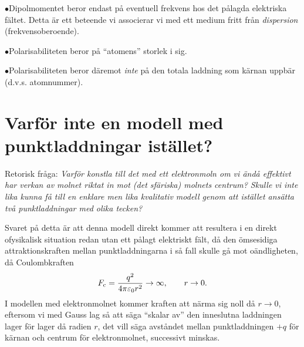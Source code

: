\item{$\bullet$}{Dipolmomentet beror endast p{\aa} eventuell frekvens hos
                 det p{\aa}lagda elektriska f{\"a}ltet. Detta {\"a}r ett
                 beteende vi associerar vi med ett medium fritt fr{\aa}n
                 {\it dispersion} (frekvensoberoende).}
\item{$\bullet$}{Polarisabiliteten beror p{\aa} ``atomens''
                 storlek i sig.}
\item{$\bullet$}{Polarisabiliteten beror d{\"a}remot {\it inte} p{\aa} den
                 totala laddning som k{\"a}rnan uppb{\"a}r (d.v.s. atomnummer).}
\medskip
\section{Varf{\"o}r inte en modell med punktladdningar ist{\"a}llet?}
Retorisk fr{\aa}ga: {\it Varf{\"o}r konstla till det med ett elektronmoln om vi
{\"a}nd{\aa} effektivt har verkan av molnet riktat in mot (det sf{\"a}riska)
molnets centrum? Skulle vi inte lika kunna f{\aa} till en enklare men lika
kvalitativ modell genom att ist{\"a}llet ans{\"a}tta tv{\aa} punktladdningar
med olika tecken?}

Svaret p{\aa} detta {\"a}r att denna modell direkt kommer att resultera i en
direkt ofysikalisk situa\-tion redan utan ett p{\aa}lagt elektriskt f{\"a}lt,
d{\aa} den {\"o}msesidiga attraktionskraften mellan punktladdningarna i s{\aa}
fall skulle g{\aa} mot o{\"a}ndligheten, d{\aa} Coulombkraften
$$
F_{\rm c}={{q^2}\over{4\pi\varepsilon_0 r^2}}\to\infty,\qquad r\to 0.
$$
I modellen med elektronmolnet kommer kraften att n{\"a}rma sig noll d{\aa}
$r\to 0$, eftersom vi med Gauss lag s{\aa} att s{\"a}ga ``skalar av'' den
inneslutna laddningen lager f{\"o}r lager d{\aa} radien $r$, det vill s{\"a}ga
avst{\aa}ndet mellan punktladdningen $+q$ f{\"o}r k{\"a}rnan och centrum
f{\"o}r elektronmolnet, successivt minskas.



